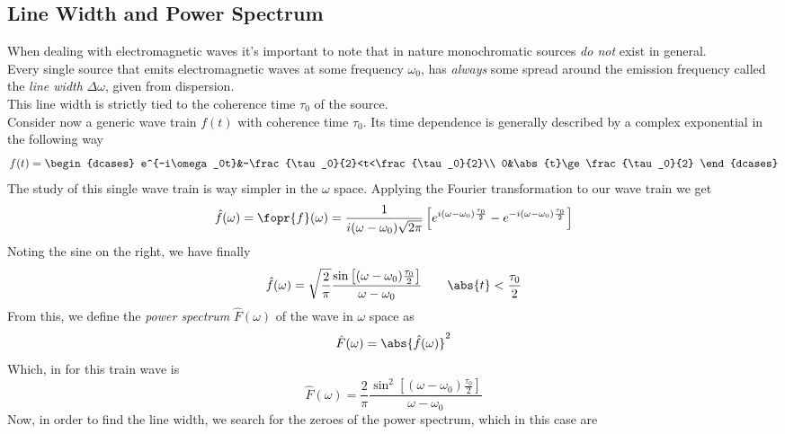 \documentclass[../electromagnetism.tex]{subfiles}
\begin{document}
\subsection{Line Width and Power Spectrum}
When dealing with electromagnetic waves it's important to note that in nature monochromatic sources \textit{do not} exist in general.\\
Every single source that emits electromagnetic waves at some frequency $\omega_0$, has \textit{always} some spread around the emission frequency called the \textit{line width} $\Delta\omega$, given from dispersion.\\
This line width is strictly tied to the coherence time $\tau_0$ of the source.\\
Consider now a generic wave train $f(t)$ with coherence time $\tau_0$. Its time dependence is generally described by a complex exponential in the following way
\begin{equation}
	f(t)=\begin{dcases}
		e^{-i\omega_0t}&-\frac{\tau_0}{2}<t<\frac{\tau_0}{2}\\
		0&\abs{t}\ge\frac{\tau_0}{2}
	\end{dcases}
	\label{eq:trainwave.cfc}
\end{equation}
The study of this single wave train is way simpler in the $\omega$ space. Applying the Fourier transformation to our wave train we get
\begin{equation*}
	\hat{f}(\omega)=\fopr{f}(\omega)=\frac{1}{i(\omega-\omega_0)\sqrt{2\pi}}\left[ e^{i(\omega-\omega_0)\frac{\tau_0}{2}}-e^{-i(\omega-\omega_0)\frac{\tau_0}{2}} \right]
\end{equation*}
Noting the sine on the right, we have finally
\begin{equation}
	\hat{f}(\omega)=\sqrt{\frac{2}{\pi}}\frac{\sin\left[ (\omega-\omega_0)\frac{\tau_0}{2} \right]}{\omega-\omega_0}\qquad\abs{t}<\frac{\tau_0}{2}
	\label{eq:ftrainwave.cfc}
\end{equation}
From this, we define the \textit{power spectrum} $\hat{F}(\omega)$ of the wave in $\omega$ space as
\begin{equation*}
	\hat{F}(\omega)=\abs{\hat{f}(\omega)}^2
\end{equation*}
Which, in for this train wave is
\begin{equation}
	\hat{F}(\omega)=\frac{2}{\pi}\frac{\sin^2\left[ (\omega-\omega_0)\frac{\tau_0}{2} \right]}{\omega-\omega_0}
	\label{eq:trainwaveps.cfc}
\end{equation}
Now, in order to find the line width, we search for the zeroes of the power spectrum, which in this case are
\end{document}
